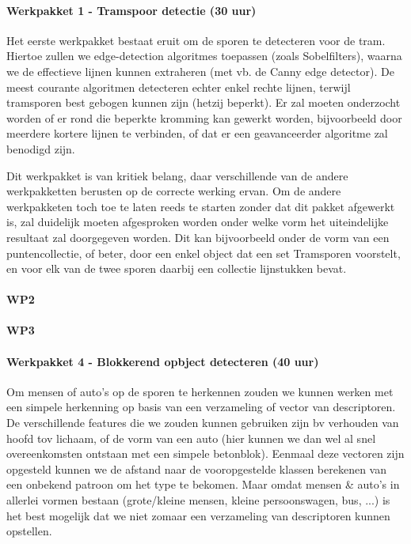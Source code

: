 \documentclass[]{book}
\begin{document}
\paragraph{Werkpakket 1 - Tramspoor detectie (30 uur)}

Het eerste werkpakket bestaat eruit om de sporen te detecteren voor de tram. Hiertoe zullen we edge-detection algoritmes toepassen (zoals Sobelfilters), waarna we de effectieve lijnen kunnen extraheren (met vb. de Canny edge detector). De meest courante algoritmen detecteren echter enkel rechte lijnen, terwijl tramsporen best gebogen kunnen zijn (hetzij beperkt). Er zal moeten onderzocht worden of er rond die beperkte kromming kan gewerkt worden, bijvoorbeeld door meerdere kortere lijnen te verbinden, of dat er een geavanceerder algoritme zal benodigd zijn.

Dit werkpakket is van kritiek belang, daar verschillende van de andere werkpakketten berusten op de correcte werking ervan. Om de andere werkpakketen toch toe te laten reeds te starten zonder dat dit pakket afgewerkt is, zal duidelijk moeten afgesproken worden onder welke vorm het uiteindelijke resultaat zal doorgegeven worden. Dit kan bijvoorbeeld onder de vorm van een puntencollectie, of beter, door een enkel object dat een set Tramsporen voorstelt, en voor elk van de twee sporen daarbij een collectie lijnstukken bevat.

\paragraph{WP2}

\paragraph{WP3}

\paragraph{Werkpakket 4 - Blokkerend opbject detecteren (40 uur)}

Om mensen of auto's op de sporen te herkennen zouden we kunnen werken met een simpele herkenning op basis van een verzameling of vector van descriptoren. De verschillende features die we zouden kunnen gebruiken zijn bv verhouden van hoofd tov lichaam, of de vorm van een auto (hier kunnen we dan wel al snel overeenkomsten ontstaan met een simpele betonblok). Eenmaal deze vectoren zijn opgesteld kunnen we de afstand naar de vooropgestelde klassen berekenen van een onbekend patroon om het type te bekomen. Maar omdat mensen \& auto's in allerlei vormen bestaan (grote/kleine mensen, kleine persoonswagen, bus, ...) is het best mogelijk dat we niet zomaar een verzameling van descriptoren kunnen opstellen.
\end{document}
